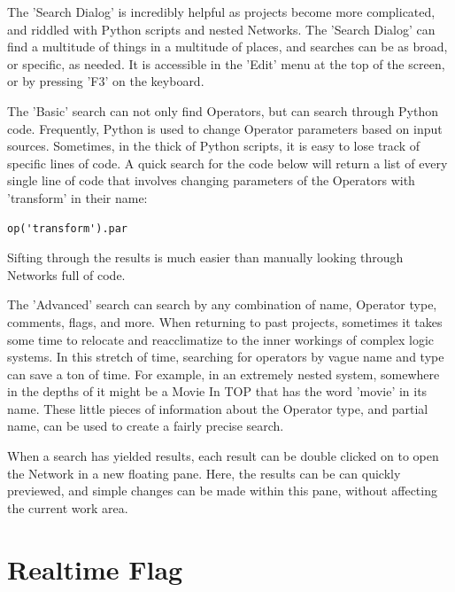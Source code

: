 \begin{fullwidth}

The 'Search Dialog' is incredibly helpful as projects become more complicated, and riddled with Python scripts and nested Networks. The 'Search Dialog' can find a multitude of things in a multitude of places, and searches can be as broad, or specific, as needed. It is accessible in the 'Edit' menu at the top of  the screen, or by pressing 'F3' on the keyboard.

The 'Basic' search can not only find Operators, but can search through Python code. Frequently, Python is used to change Operator parameters based on input sources. Sometimes, in the thick of Python scripts, it is easy to lose track of specific lines of code. A quick search for the code below will return a list of every single line of code that involves changing parameters of the Operators with 'transform' in their name:

\begin{lstlisting}
op('transform').par
\end{lstlisting}

Sifting through the results is much easier than manually looking through Networks full of code. 


The 'Advanced' search can search by any combination of name, Operator type, comments, flags, and more. When returning to past projects, sometimes it takes some time to relocate and reacclimatize to the inner workings of complex logic systems. In this stretch of time, searching for operators by vague name and type can save a ton of time. For example, in an extremely nested system, somewhere in the depths of it might be a Movie In TOP that has the word 'movie' in its name. These little pieces of information about the Operator type, and partial name, can be used to create a fairly precise search. 

When a search has yielded results, each result can be double clicked on to open the Network in a new floating pane. Here, the results can be can quickly previewed, and simple changes can be made within this pane, without affecting the current work area.

\end{fullwidth}
\section{Realtime Flag}

